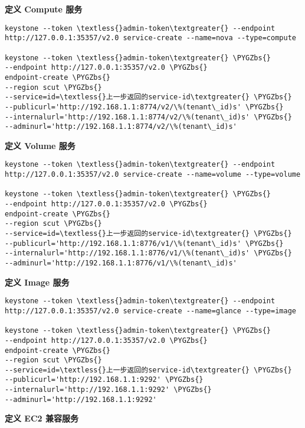 \documentclass[a4paper,12pt,english]{sphinxmanual}
\def\PYGZbs{\char`\\}
\begin{document}
\textbf{定义 Compute 服务}

\begin{Verbatim}[commandchars=\\\{\}]
keystone --token \textless{}admin-token\textgreater{} --endpoint http://127.0.0.1:35357/v2.0 service-create --name=nova --type=compute

keystone --token \textless{}admin-token\textgreater{} \PYGZbs{}
--endpoint http://127.0.0.1:35357/v2.0 \PYGZbs{}
endpoint-create \PYGZbs{}
--region scut \PYGZbs{}
--service=id=\textless{}上一步返回的service-id\textgreater{} \PYGZbs{}
--publicurl='http://192.168.1.1:8774/v2/\%(tenant\_id)s' \PYGZbs{}
--internalurl='http://192.168.1.1:8774/v2/\%(tenant\_id)s' \PYGZbs{}
--adminurl='http://192.168.1.1:8774/v2/\%(tenant\_id)s'
\end{Verbatim}

\textbf{定义 Volume 服务}

\begin{Verbatim}[commandchars=\\\{\}]
keystone --token \textless{}admin-token\textgreater{} --endpoint http://127.0.0.1:35357/v2.0 service-create --name=volume --type=volume

keystone --token \textless{}admin-token\textgreater{} \PYGZbs{}
--endpoint http://127.0.0.1:35357/v2.0 \PYGZbs{}
endpoint-create \PYGZbs{}
--region scut \PYGZbs{}
--service=id=\textless{}上一步返回的service-id\textgreater{} \PYGZbs{}
--publicurl='http://192.168.1.1:8776/v1/\%(tenant\_id)s' \PYGZbs{}
--internalurl='http://192.168.1.1:8776/v1/\%(tenant\_id)s' \PYGZbs{}
--adminurl='http://192.168.1.1:8776/v1/\%(tenant\_id)s'
\end{Verbatim}

\textbf{定义 Image 服务}

\begin{Verbatim}[commandchars=\\\{\}]
keystone --token \textless{}admin-token\textgreater{} --endpoint http://127.0.0.1:35357/v2.0 service-create --name=glance --type=image

keystone --token \textless{}admin-token\textgreater{} \PYGZbs{}
--endpoint http://127.0.0.1:35357/v2.0 \PYGZbs{}
endpoint-create \PYGZbs{}
--region scut \PYGZbs{}
--service=id=\textless{}上一步返回的service-id\textgreater{} \PYGZbs{}
--publicurl='http://192.168.1.1:9292' \PYGZbs{}
--internalurl='http://192.168.1.1:9292' \PYGZbs{}
--adminurl='http://192.168.1.1:9292'
\end{Verbatim}

\textbf{定义 EC2 兼容服务}
\end{document}

